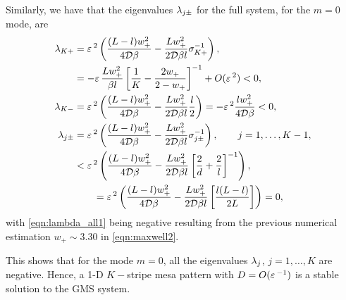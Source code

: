 Similarly, we have that the eigenvalues $\lambda_{j\pm}$ for the full system, for the $m=0$ mode, are
%
\begin{subequations}
\label{eqn:lambda_all}
\begin{align}
\label{eqn:lambda_all1}
  \lambda_{K+} &= \varepsilon\,^2\left(\frac{(L-l)w_+^2}{4\mathcal{D}\beta}-\frac{Lw_+^2}{2\mathcal{D}\beta l}\sigma_{K+}^{-1} \right),\\
		  &= - \varepsilon\,\frac{Lw_+^2}{\beta l}\left[\frac{1}{K}-\frac{2w_+}{2-w_+}\right]^{-1} +O(\varepsilon\,^2)<0,\notag\\
\label{eqn:lambda_all2}
  \lambda_{K-} &= \varepsilon\,^2\left(\frac{(L-l)w_+^2}{4\mathcal{D}\beta}-\frac{Lw_+^2}{2\mathcal{D}\beta l}\frac{l}{2}\right) = -\varepsilon\,^2\frac{lw_+^2}{4\mathcal{D}\beta}<0,\\
\label{eqn:lambda_all3}
  \lambda_{j\pm} &= \varepsilon\,^2\left(\frac{(L-l)w_+^2}{4\mathcal{D}\beta}-\frac{Lw_+^2}{2\mathcal{D}\beta l}\sigma_{j\pm}^{-1} \right),\qquad j=1,\hdots,K-1,\\
		  &<\varepsilon\,^2\left(\frac{(L-l)w_+^2}{4\mathcal{D}\beta}-\frac{Lw_+^2}{2\mathcal{D}\beta l}\left[\frac{2}{d}+\frac{2}{l}\right]^{-1} \right),\notag\\
		  &\qquad = \varepsilon\,^2\left(\frac{(L-l)w_+^2}{4\mathcal{D}\beta}-\frac{Lw_+^2}{2\mathcal{D}\beta l}\left[\frac{l(L-l)}{2L}\right] \right) = 0,\notag
\end{align}
\end{subequations}
% 
with \eqref{eqn:lambda_all1} being negative resulting from the previous numerical estimation $w_+\sim3.30$ in \eqref{eqn:maxwell2}.

This shows that for the mode $m=0$, all the eigenvalues $\lambda_j$, $j=1,\hdots,K$ are negative. Hence, a 1-D $K-$stripe mesa pattern with $D=O(\varepsilon\,^{-1})$ is a stable solution to the GMS system.